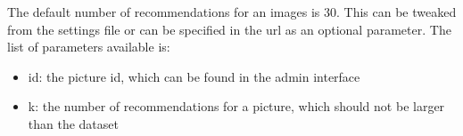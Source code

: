 The default number of recommendations for an images is 30. This can be tweaked from the settings file or can be specified in the url as an optional parameter. The list of parameters available is:

\begin{itemize}
\item{id: the picture id, which can be found in the admin interface}
\item{k: the number of recommendations for a picture, which should not be larger than the dataset}
\end{itemize}

